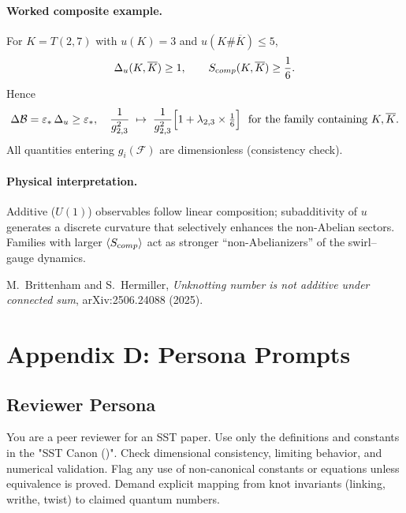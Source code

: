 \documentclass[11pt]{article}
\begin{document}
\paragraph{Worked composite example.}
    For \(K=T(2,7)\) with \(u(K)=3\) and \(u(K\#\overline K)\le 5\),
    \[
        \Delta_u(K,\overline K)\ge 1,\qquad
        S_{\textrm comp}(K,\overline K)\ge \frac{1}{6}.
    \]
    Hence
    \[
        \Delta\mathcal B=\varepsilon_*\,\Delta_u\ge \varepsilon_*,
        \quad
        \frac{1}{g_{2,3}^2}\;\mapsto\;\frac{1}{g_{2,3}^2}\Bigl[1+\lambda_{2,3}\times\tfrac{1}{6}\Bigr]
        \ \ \text{for the family containing }K,\overline K.
    \]
    All quantities entering \(g_i(\mathcal F)\) are dimensionless (consistency check).

\paragraph{Physical interpretation.}
    Additive (\(U(1)\)) observables follow linear composition; subadditivity of \(u\) generates a discrete curvature that selectively enhances the non-Abelian sectors. Families with larger \(\langle S_{\textrm comp}\rangle\) act as stronger “non-Abelianizers” of the swirl–gauge dynamics.

    \begin{thebibliography}{9}
    M.~Brittenham and S.~Hermiller,
    \emph{Unknotting number is not additive under connected sum},
    arXiv:2506.24088 (2025).
    \end{thebibliography}

\section*{Appendix D: Persona Prompts}
\label{sec:personas}

\subsection*{Reviewer Persona}
    \scriptsize
    You are a peer reviewer for an SST paper. Use only the definitions and constants in the "SST Canon (\canonversion)".
    Check dimensional consistency, limiting behavior, and numerical validation. Flag any use of non-canonical
    constants or equations unless equivalence is proved. Demand explicit mapping from knot invariants (linking,
    writhe, twist) to claimed quantum numbers.
\end{document}
